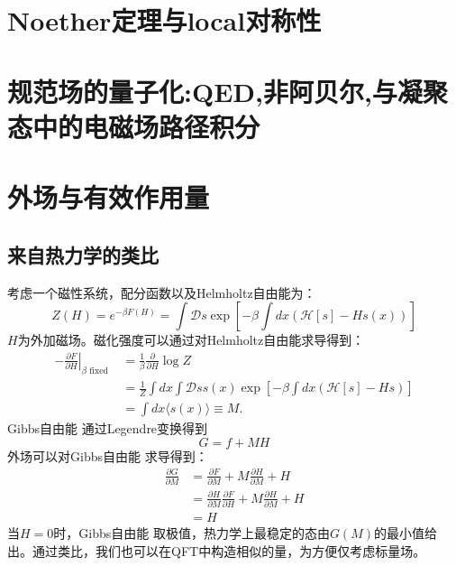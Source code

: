 \documentclass[10pt,openany]{book}
\theoremstyle{thmstyle} %
\theoremstyle{defstyle} %
\theoremstyle{prostyle} %
\begin{document}
\section{Noether定理与local对称性}
  \section{规范场的量子化:QED,非阿贝尔,与凝聚态中的电磁场路径积分}

\section{外场与有效作用量}
\subsection{来自热力学的类比}
考虑一个磁性系统，配分函数以及Helmholtz自由能为：
\begin{equation}
  Z(H)=e^{-\beta F(H)}=\int \mathcal{D} s \exp \left[-\beta \int d x(\mathcal{H}[s]-H s(x))\right]
\end{equation}
$ H $为外加磁场。磁化强度可以通过对Helmholtz自由能求导得到：
\begin{equation*}
  \begin{aligned}
    -\left.\frac{\partial F}{\partial H}\right|_{\beta \text { fixed }} & =\frac{1}{\beta} \frac{\partial}{\partial H} \log Z \\
    & =\frac{1}{Z} \int d x \int \mathcal{D} s s(x) \exp \left[-\beta \int d x(\mathcal{H}[s]-H s)\right] \\
    & =\int d x\langle s(x)\rangle \equiv M .
    \end{aligned}
\end{equation*}
Gibbs自由能 通过Legendre变换得到
\begin{equation*}
  G=f+MH
\end{equation*}
外场可以对Gibbs自由能 求导得到：
\begin{equation}
  \begin{aligned}
    \frac{\partial G}{\partial M} & =\frac{\partial F}{\partial M}+M \frac{\partial H}{\partial M}+H \\
    & =\frac{\partial H}{\partial M} \frac{\partial F}{\partial H}+M \frac{\partial H}{\partial M}+H \\
    & =H
    \end{aligned}
\end{equation}
当$ H=0 $时，Gibbs自由能 取极值，热力学上最稳定的态由$ G(M) $的最小值给出。通过类比，我们也可以在QFT中构造相似的量，为方便仅考虑标量场。
\end{document}
